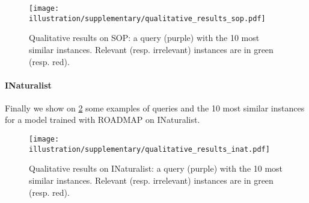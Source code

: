 \begin{figure}[ht]
    \centering
    \texttt{[image: illustration/supplementary/qualitative\_results\_sop.pdf]}
    \caption{Qualitative results on SOP: a query (purple) with the 10 most similar instances. Relevant (resp. irrelevant) instances are in green (resp. red).}
    \label{fig:qualitative_results_sop}
\end{figure}


\paragraph{INaturalist} Finally we show on \cref{fig:qualitative_results_inat} some examples of queries and the 10 most similar instances for a model trained with ROADMAP on INaturalist.

\begin{figure}[ht]
    \centering
    \texttt{[image: illustration/supplementary/qualitative\_results\_inat.pdf]}
    \caption{Qualitative results on INaturalist: a query (purple) with the 10 most similar instances. Relevant (resp. irrelevant) instances are in green (resp. red).}
    \label{fig:qualitative_results_inat}
\end{figure}
